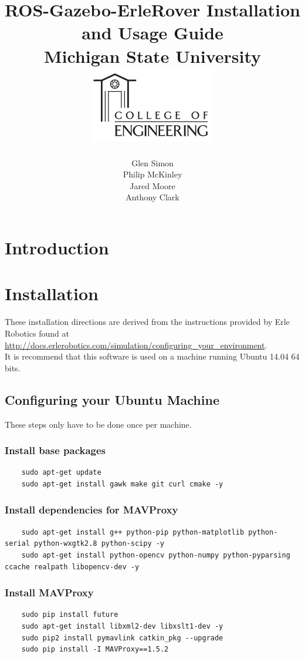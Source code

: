 \documentclass{report}
\title
{
	\textbf{{ROS-Gazebo-ErleRover Installation and Usage Guide}\\
	{Michigan State University}\\}
	\includegraphics{Images/MSU_Lab_Cover_Image.png}
}
\author{Glen Simon\\
Philip McKinley\\
Jared Moore\\
Anthony Clark}
\begin{document}
\maketitle

\newpage
\tableofcontents
\clearpage

\chapter{Introduction}

\chapter{Installation}
These installation directions are derived from the instructions provided by Erle Robotics found at\\ \href{http://docs.erlerobotics.com/simulation/configuring\_your\_environment}{http://docs.erlerobotics.com/simulation/configuring\_your\_environment}.
\\

It is recommend that this software is used on a machine running Ubuntu 14.04 64 bits.

\section{Configuring your Ubuntu Machine}
These steps only have to be done once per machine.
\subsection{Install base packages}
\begin{lstlisting}
	sudo apt-get update
	sudo apt-get install gawk make git curl cmake -y
\end{lstlisting}

\subsection{Install dependencies for MAVProxy}
\begin{lstlisting}
	sudo apt-get install g++ python-pip python-matplotlib python-serial python-wxgtk2.8 python-scipy -y
	sudo apt-get install python-opencv python-numpy python-pyparsing ccache realpath libopencv-dev -y
\end{lstlisting}

\subsection{Install MAVProxy}
\begin{lstlisting}
	sudo pip install future
	sudo apt-get install libxml2-dev libxslt1-dev -y
	sudo pip2 install pymavlink catkin_pkg --upgrade
	sudo pip install -I MAVProxy==1.5.2
\end{lstlisting}
\end{document}
